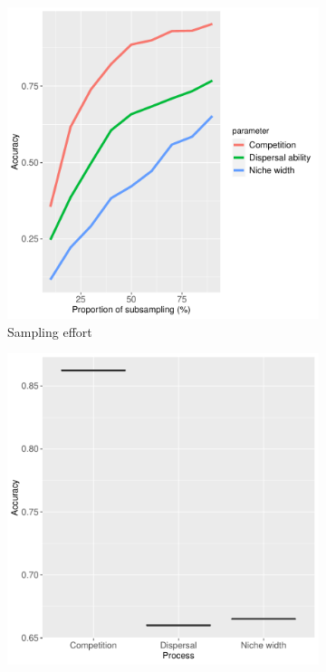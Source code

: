 \begin{figure}
	\centering
	\begin{subfigure}[b]{0.47\textwidth}
		\includegraphics[width=\textwidth]{./figures/Robustness_sampling_effort_Accuracy.pdf}
		\caption{Sampling effort}
		\label{fig:robust-samp}
	\end{subfigure}
	\begin{subfigure}[b]{0.47\textwidth}
		\includegraphics[width=\textwidth]{./figures/Robustness_time_step_Accuracy_distribution.pdf}

\end{subfigure}
\end{figure}
